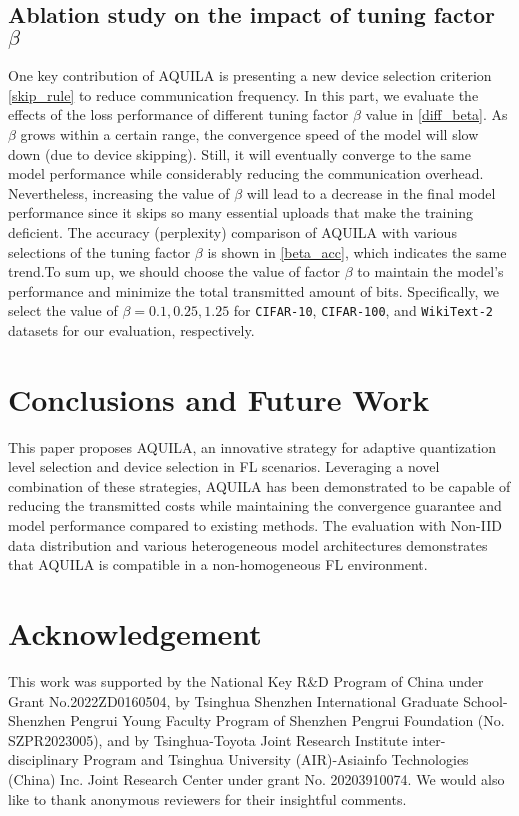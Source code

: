 \documentclass[lettersize,journal]{IEEEtran}
\begin{document}
\subsection{Ablation study on the impact of tuning factor $\beta$}
One key contribution of AQUILA is presenting a new device selection criterion \eqref{skip_rule} to reduce communication frequency. In this part, we evaluate the effects of the loss performance of different tuning factor $\beta$ value in \cref{diff_beta}. As $\beta$ grows within a certain range, the convergence speed of the model will slow down (due to device skipping). Still, it will eventually converge to the same model performance while considerably reducing the communication overhead. Nevertheless, increasing the value of $\beta$ will lead to a decrease in the final model performance since it skips so many essential uploads that make the training deficient. The accuracy (perplexity) comparison of AQUILA with various selections of the tuning factor $\beta$ is shown in \cref{beta_acc}, which indicates the same trend.To sum up, we should choose the value of factor $\beta$ to maintain the model's performance and minimize the total transmitted amount of bits. Specifically, we select the value of $\beta = 0.1, 0.25, 1.25$ for \texttt{CIFAR-10}, \texttt{CIFAR-100}, and \texttt{WikiText-2} datasets for our evaluation, respectively.

\section{Conclusions and Future Work}
This paper proposes AQUILA, an innovative strategy for adaptive quantization level selection and device selection in FL scenarios. 
Leveraging a novel combination of these strategies, AQUILA has been demonstrated to be capable of reducing the transmitted costs while maintaining the convergence guarantee and model performance compared to existing methods. The evaluation with Non-IID data distribution and various heterogeneous model architectures demonstrates that AQUILA is compatible in a non-homogeneous FL environment.

\section*{Acknowledgement}
This work was supported by the National Key R\&D Program of China under Grant No.2022ZD0160504, by Tsinghua Shenzhen International Graduate School-Shenzhen Pengrui Young Faculty Program of Shenzhen Pengrui Foundation (No. SZPR2023005), and by Tsinghua-Toyota Joint Research Institute inter-disciplinary Program and Tsinghua University (AIR)-Asiainfo Technologies (China) Inc. Joint Research Center under grant No. 20203910074. We would also like to thank anonymous reviewers for their insightful comments.
\end{document}
